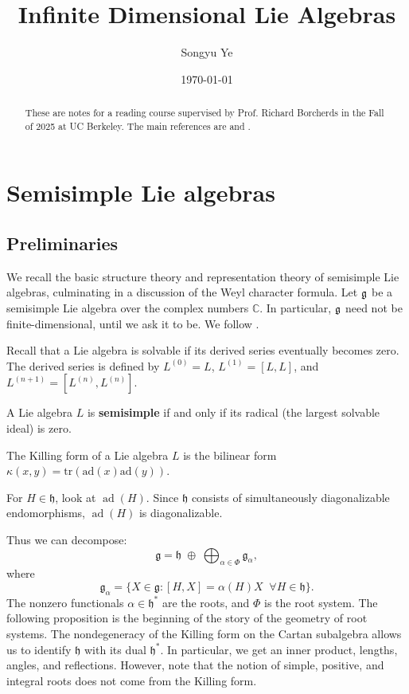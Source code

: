 \documentclass[12pt]{article}
\begin{document}
\rhead{\today}
\cfoot{\thepage}

\title{Infinite Dimensional Lie Algebras}

\author{Songyu Ye}
\date{\today}
\maketitle


\begin{abstract}
    These are notes for a reading course supervised by Prof. Richard Borcherds in the Fall of 2025 at UC Berkeley. The main references are \cite{kac} and \cite{pressley-segal}.
\end{abstract}
\tableofcontents

\section{Semisimple Lie algebras}
\subsection{Preliminaries}
We recall the basic structure theory and representation theory of semisimple Lie algebras, culminating in a discussion of the Weyl character formula. Let $\mathfrak{g}$ be a semisimple Lie algebra over the complex numbers $\mathbb{C}$. In particular, $\mathfrak{g}$ need not be finite-dimensional, until we ask it to be. We follow \cite{bump}.
\begin{definition}
    Recall that a Lie algebra is solvable if its derived series eventually becomes zero. The derived series is defined by $L^{(0)} = L$, $L^{(1)} = [L,L]$, and $L^{(n+1)} = [L^{(n)}, L^{(n)}]$.
\end{definition}

\begin{definition}
    A Lie algebra $L$ is \textbf{semisimple} if and only if its radical (the largest solvable ideal) is zero.
\end{definition}

\begin{definition}
    The Killing form of a Lie algebra $L$ is the bilinear form $\kappa(x,y) = \text{tr}(\text{ad}(x)\text{ad}(y))$.
\end{definition}
For $H \in \mathfrak{h}$, look at $\operatorname{ad}(H)$. Since $\mathfrak{h}$ consists of simultaneously diagonalizable endomorphisms, $\operatorname{ad}(H)$ is diagonalizable.

Thus we can decompose:
\[
    \mathfrak{g} = \mathfrak{h} \;\oplus\; \bigoplus_{\alpha \in \Phi} \mathfrak{g}_\alpha,
\]
where
\[
    \mathfrak{g}_\alpha = \{ X \in \mathfrak{g} : [H,X] = \alpha(H) X \;\;\forall H\in \mathfrak{h}\}.
\]
The nonzero functionals $\alpha \in \mathfrak{h}^*$ are the roots, and $\Phi$ is the root system. The following proposition is the beginning of the story of the geometry of root systems. The nondegeneracy of the Killing form on the Cartan subalgebra allows us to identify $\mathfrak{h}$ with its dual $\mathfrak{h}^*$. In particular, we get an inner product, lengths, angles, and reflections. However, note that the notion of simple, positive, and integral roots does not come from the Killing form.
\end{document}
